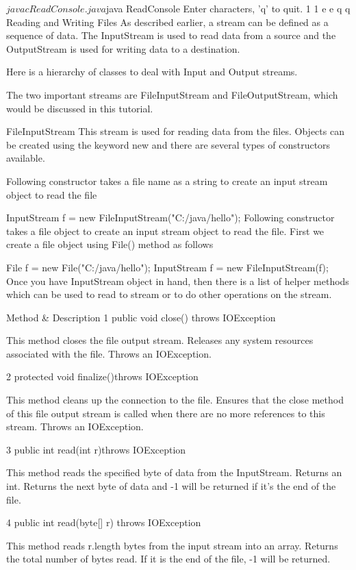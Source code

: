 $javac ReadConsole.java
$java ReadConsole
Enter characters, 'q' to quit.
1
1
e
e
q
q
Reading and Writing Files
As described earlier, a stream can be defined as a sequence of data. The InputStream is used to read data from a source and the OutputStream is used for writing data to a destination.

Here is a hierarchy of classes to deal with Input and Output streams.



The two important streams are FileInputStream and FileOutputStream, which would be discussed in this tutorial.

FileInputStream
This stream is used for reading data from the files. Objects can be created using the keyword new and there are several types of constructors available.

Following constructor takes a file name as a string to create an input stream object to read the file

InputStream f = new FileInputStream("C:/java/hello");
Following constructor takes a file object to create an input stream object to read the file. First we create a file object using File() method as follows

File f = new File("C:/java/hello");
InputStream f = new FileInputStream(f);
Once you have InputStream object in hand, then there is a list of helper methods which can be used to read to stream or to do other operations on the stream.

 	Method & Description
1
public void close() throws IOException{}

This method closes the file output stream. Releases any system resources associated with the file. Throws an IOException.

2
protected void finalize()throws IOException {}

This method cleans up the connection to the file. Ensures that the close method of this file output stream is called when there are no more references to this stream. Throws an IOException.

3
 public int read(int r)throws IOException{}

This method reads the specified byte of data from the InputStream. Returns an int. Returns the next byte of data and -1 will be returned if it's the end of the file.

4
 public int read(byte[] r) throws IOException{}

This method reads r.length bytes from the input stream into an array. Returns the total number of bytes read. If it is the end of the file, -1 will be returned.

